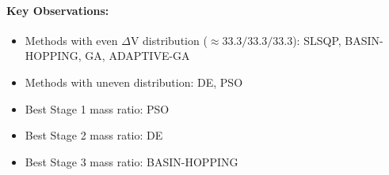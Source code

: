 \documentclass{article}
\begin{document}
\paragraph{Key Observations:}
\begin{itemize}
\item Methods with even $\Delta$V distribution ($\approx33.3/33.3/33.3$): SLSQP, BASIN-HOPPING, GA, ADAPTIVE-GA
\item Methods with uneven distribution: DE, PSO
\item Best Stage 1 mass ratio: PSO
\item Best Stage 2 mass ratio: DE
\item Best Stage 3 mass ratio: BASIN-HOPPING
\end{itemize}
\end{document}

